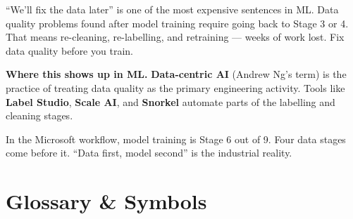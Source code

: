 \documentclass[a4paper,11pt]{article}
\newcommand{\vocab}[1]{\textbf{\color{navy}#1}}
\begin{document}
\begin{watchout}
``We'll fix the data later'' is one of the most expensive sentences in ML.
Data quality problems found after model training require going back to Stage 3 or 4.
That means re-cleaning, re-labelling, and retraining --- weeks of work lost.
Fix data quality before you train.
\end{watchout}

\noindent\textbf{Where this shows up in ML.}
\vocab{Data-centric AI} (Andrew Ng's term) is the practice of treating data quality as the primary engineering activity.
Tools like \vocab{Label Studio}, \vocab{Scale AI}, and \vocab{Snorkel} automate parts of the labelling and cleaning stages.

\begin{keytake}
In the Microsoft workflow, model training is Stage 6 out of 9.
Four data stages come before it.
``Data first, model second'' is the industrial reality.
\end{keytake}

\section*{Glossary \& Symbols}
\end{document}
